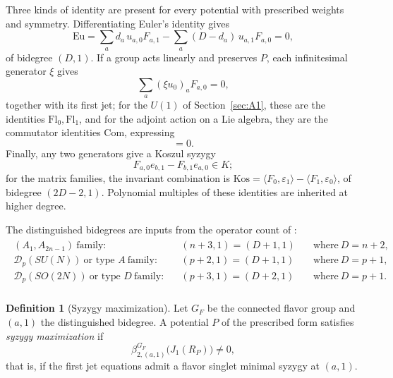 \documentclass[10pt,reqno]{amsart}
\numberwithin{equation}{section}
\theoremstyle{plain}
\theoremstyle{definition}
\newtheorem{definition}[theorem]{Definition}
\newcommand{\Eu}{\mathrm{Eu}}
\newcommand{\Kos}{\mathrm{Kos}}
\newcommand{\Fl}{\mathrm{Fl}}
\newcommand{\ip}[2]{\langle #1, #2\rangle}
\begin{document}
Three kinds of identity are present for every potential with prescribed weights and symmetry. Differentiating Euler's identity gives
\begin{equation}\label{eq:Euler}
	\Eu=\sum_ad_a\,u_{a,0}F_{a,1}-\sum_a(D-d_a)\,u_{a,1}F_{a,0}=0,
\end{equation}
of bidegree $(D,1)$. If a group acts linearly and preserves $P$, each infinitesimal generator $\xi$ gives 
\begin{equation*}
    \sum_a(\xi u_0)_aF_{a,0}=0,
\end{equation*}
together with its first jet; for the $U(1)$ of Section~\ref{sec:A1}, these are the identities $\Fl_0,\Fl_1$, and for the adjoint action on a Lie algebra, they are the commutator identities $\mathrm{Com}$, expressing 
\begin{equation*}
    [M,\nabla P(M)]=0.
\end{equation*}
Finally, any two generators give a Koszul syzygy \cite{Eisenbud}
\begin{equation*}
    F_{a,0}e_{b,1}-F_{b,1}e_{a,0}\in K;
\end{equation*}
for the matrix families, the invariant combination is $\Kos=\ip{F_0}{\varepsilon_1}-\ip{F_1}{\varepsilon_0}$, of bidegree $(2D-2,1)$. Polynomial multiples of these identities are inherited at higher degree.

The distinguished bidegrees are inputs from the operator count of \cite{KLSnonpoint,Kang:2026ney}: 
\begin{align}
\begin{aligned}
    (A_1,A_{2n-1})\ \text{family}:&\qquad (n+3,1)=(D+1,1)\quad &\text{where}\ D=n+2, \\
    \mathcal{D}_p(SU(N))\ \text{or type }A\ \text{family}:&\qquad (p+2,1)=(D+1,1)\quad &\text{where}\ D=p+1, \\
    \mathcal{D}_p(SO(2N))\ \text{or type }D\  \text{family}:&\qquad (p+3,1)=(D+2,1)\quad &\text{where}\ D=p+1. \\
\end{aligned}
\end{align}

\begin{definition}[Syzygy maximization]\label{def:maximization}
Let $G_F$ be the connected flavor group and $(a,1)$ the distinguished bidegree. A potential $P$ of the prescribed form satisfies \emph{syzygy maximization} if
\begin{equation}
	\beta^{G_F}_{2,(a,1)}\big(J_1(R_P)\big)\neq0,
\end{equation}
that is, if the first jet equations admit a flavor singlet minimal syzygy at $(a,1)$.
\end{definition}
\end{document}
